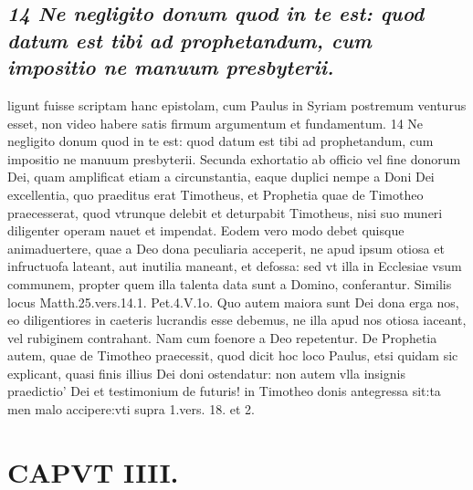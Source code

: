 \documentclass{article}
\begin{document}
\begin{pages}
\subsection*{\textit{14 Ne negligito donum quod in te est: quod datum est tibi ad prophetandum, cum impositio ne manuum presbyterii.}}ligunt fuisse scriptam hanc epistolam, cum Paulus in Syriam postremum venturus esset, non video habere satis firmum argumentum et fundamentum. 14 Ne negligito donum quod in te est: quod datum est tibi ad prophetandum, cum impositio ne manuum presbyterii. Secunda exhortatio ab officio vel fine donorum Dei, quam amplificat etiam a circunstantia, eaque duplici nempe a Doni Dei excellentia, quo praeditus erat Timotheus, et Prophetia quae de Timotheo praecesserat, quod vtrunque delebit et deturpabit Timotheus, nisi suo muneri diligenter operam nauet et impendat. Eodem vero modo debet quisque animaduertere, quae a Deo dona peculiaria acceperit, ne apud ipsum otiosa et infructuofa lateant, aut inutilia maneant, et defossa: sed vt illa in Ecclesiae vsum communem, propter quem illa talenta data sunt a Domino, conferantur. Similis locus Matth.25.vers.14.1. Pet.4.V.1o. Quo autem maiora sunt Dei dona erga nos, eo diligentiores in caeteris lucrandis esse debemus, ne illa apud nos otiosa iaceant, vel rubiginem contrahant. Nam cum foenore a Deo repetentur. De Prophetia autem, quae de Timotheo praecessit, quod dicit hoc loco Paulus, etsi quidam sic explicant, quasi finis illius Dei doni ostendatur: non autem vlla insignis praedictio' Dei et testimonium de futuris! in Timotheo donis antegressa sit:ta men malo accipere:vti supra 1.vers. 18. et 2.  \pend
\section*{CAPVT  IIII. }
\marginpar{[ p.235 ]}\pstart {}
{}

\end{pages}
\end{document}
